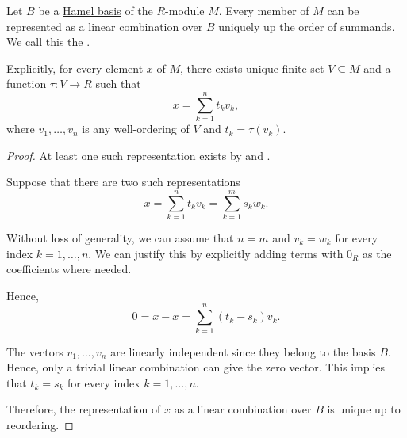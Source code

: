 \begin{proposition}\label{thm:module_basis_decomposition}
  Let \( B \) be a \hyperref[def:semimodule_basis/independent]{Hamel basis} of the \( R \)-module \( M \). Every member of \( M \) can be represented as a linear combination over \( B \) uniquely up the order of summands. We call this the .

  Explicitly, for every element \( x \) of \( M \), there exists unique finite set \( V \subseteq M \) and a function \( \tau: V \to R \) such that
  \begin{equation*}
    x = \sum_{k=1}^n t_k v_k,
  \end{equation*}
  where \( v_1, \ldots, v_n \) is any well-ordering of \( V \) and \( t_k = \tau(v_k) \).
\end{proposition}
\begin{proof}
  At least one such representation exists by  and .

  Suppose that there are two such representations
  \begin{equation*}
    x = \sum_{k=1}^n t_k v_k = \sum_{k=1}^m s_k w_k.
  \end{equation*}

  Without loss of generality, we can assume that \( n = m \) and \( v_k = w_k \) for every index \( k = 1, \ldots, n \). We can justify this by explicitly adding terms with \( 0_R \) as the coefficients where needed.

  Hence,
  \begin{equation*}
    0 = x - x = \sum_{k=1}^n (t_k - s_k) v_k.
  \end{equation*}

  The vectors \( v_1, \ldots, v_n \) are linearly independent since they belong to the basis \( B \). Hence, only a trivial linear combination can give the zero vector. This implies that \( t_k = s_k \) for every index \( k = 1, \ldots, n \).

  Therefore, the representation of \( x \) as a linear combination over \( B \) is unique up to reordering.
\end{proof}

